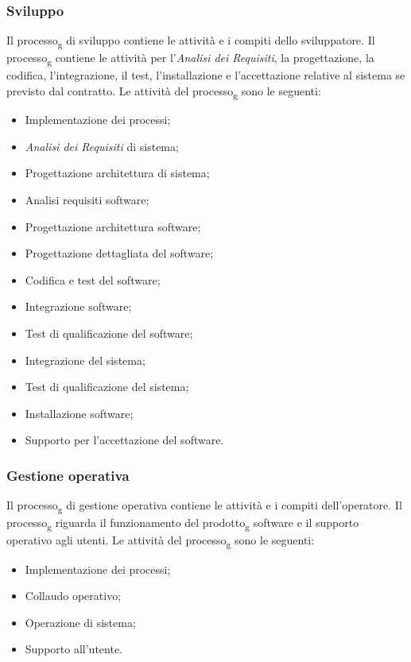 \subsubsection{Sviluppo}
Il processo\textsubscript{g} di sviluppo contiene le attività e i compiti dello sviluppatore.
Il processo\textsubscript{g} contiene le attività per l'\textit{Analisi dei Requisiti}, la progettazione, la codifica, l'integrazione, il test, l'installazione e l'accettazione relative al sistema se previsto dal contratto.
Le attività del processo\textsubscript{g} sono le seguenti:
\begin{itemize}
\item Implementazione dei processi;
\item \textit{Analisi dei Requisiti} di sistema;
\item Progettazione architettura di sistema;
\item Analisi requisiti software;
\item Progettazione architettura software;
\item Progettazione dettagliata del software;
\item Codifica e test del software;
\item Integrazione software;
\item Test di qualificazione del software;
\item Integrazione del sistema;
\item Test di qualificazione del sistema; 
\item Installazione software;
\item Supporto per l'accettazione del software.
\end{itemize}

\subsubsection{Gestione operativa}
Il processo\textsubscript{g} di gestione operativa contiene le attività e i compiti dell'operatore. Il processo\textsubscript{g} riguarda il funzionamento del prodotto\textsubscript{g} software e il supporto operativo agli utenti. 
Le attività del processo\textsubscript{g} sono le seguenti:
\begin{itemize}
\item Implementazione dei processi;
\item Collaudo operativo;
\item Operazione di sistema;
\item Supporto all'utente.
\end{itemize}

